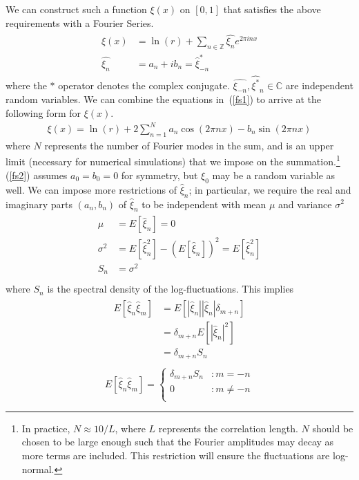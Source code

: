 We can construct such a
function $\xi(x)$ on $[0,1]$ that satisfies the above requirements with a Fourier
Series.
\begin{align}\label{fs1}
\begin{split}
\xi(x) &= \ln(r) + \sum_{n \in \mathbb{Z}}\hat{\xi_n}e^{2\pi inx}\\
\hat{\xi_n} &= a_n + ib_n = \hat{\xi}_{-n}^*
\end{split}
\end{align}
where the $*$ operator denotes the complex
conjugate. $\hat{\xi_{-n}},\hat{\xi^*}_{n} \in \mathbb{C}$ are
independent random variables. We can combine
the equations in~(\ref{fs1}) to arrive at the following form for
$\xi(x)$.
\begin{align}\label{fs2}
\xi(x) = \ln(r) + 2\sum^N_{n=1}a_n\cos(2\pi nx)-b_n\sin(2\pi nx)
\end{align}
where $N$ represents the number of Fourier modes in the sum, and is an
upper limit (necessary for numerical
simulations) that we impose on the summation.\footnote{In practice, $N
  \approx 10/L$, where $L$ represents the correlation length. $N$
  should be chosen to be large enough such that the Fourier amplitudes
may decay as more terms are included. This restriction will ensure the
fluctuations are log-normal.} (\ref{fs2}) assumes
$a_0=b_0=0$ for symmetry, but $\hat{\xi_0}$ may be a random variable as well. We can impose more restrictions of $\hat{\xi}_n$; in particular,
we require the real and imaginary parts $(a_n,b_n)$ of $\hat{\xi}_n$
to be independent with mean $\mu$ and variance $\sigma^2$
\begin{align}
\begin{split}\label{Sn}
\mu&=E[\hat{\xi}_n]=0\\
\sigma^2&=E[\hat{\xi}_n^2]-(E[\hat{\xi}_n])^2=E[\hat{\xi}_n^2]\\
S_n&=\sigma^2\\
\end{split}
\end{align}
where $S_n$ is the spectral density of the log-fluctuations. This
implies
\begin{align*}
\begin{split}
E[\hat{\xi}_n\hat{\xi}_m]&=E[|\hat{\xi}_n||\hat{\xi}_n|\delta_{m+n}]\\
&=\delta_{m+n}E[|\hat{\xi}_n|^2]\\
&=\delta_{m+n}S_n\\
\end{split}
\end{align*}
\begin{displaymath}
   E[\hat{\xi}_n\hat{\xi}_m] = \left\{
     \begin{array}{lr}
       \delta_{m+n}S_n & : m = -n\\
       0 & : m \neq -n\\
     \end{array}
   \right.
\end{displaymath} 
